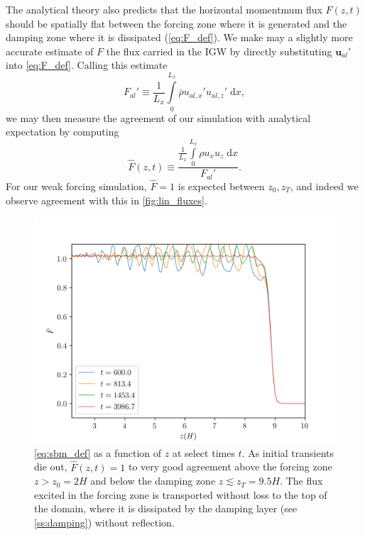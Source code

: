 \documentclass[
        fleqn,
        usenatbib,
    ]{mnras}
\newcommand*{\bm}[1]{\boldsymbol{\mathbf{#1}}}
\begin{document}
The analytical theory also predicts that the horizontal momentmum flux $F(z, t)$
should be spatially flat between the forcing zone where it is generated and the
damping zone where it is dissipated (\autoref{eq:F_def}). We make may a slightly
more accurate estimate of $F$ the flux carried in the IGW by directly
substituting $\bm{u}_{al}'$ into \autoref{eq:F_def}. Calling this estimate
\begin{equation}
    F_{al}' \equiv \frac{1}{L_x}
        \int\limits_{0}^{L_x} \overline{\rho} u_{al,x}'u_{al,z}'\;\mathrm{d}x,
\end{equation}
we may then measure the agreement of our simulation with analytical expectation
by computing
\begin{equation}
    \hat{F}(z, t) \equiv \frac{
        \frac{1}{L_x}\int\limits_0^{L_x}\rho u_xu_z\;\mathrm{d}x}
        {F_{al}'}.\label{eq:sbm_def}
\end{equation}
For our weak forcing simulation, $\hat{F} = 1$ is expected between $z_0, z_T$,
and indeed we observe agreement with this in \autoref{fig:lin_fluxes}.
\begin{figure}
    \centering
    \includegraphics[width=\columnwidth]{plots/lin_fluxes.png}
    \caption{\autoref{eq:sbm_def} as a function of $z$ at select times $t$. As
    initial transients die out, $\hat{F}(z, t) = 1$ to very good agreement above
    the forcing zone $z > z_0 = 2H$ and below the damping zone $z \lesssim z_T =
    9.5H$. The flux excited in the forcing zone is transported without loss to
    the top of the domain, where it is dissipated by the damping layer (see
    \autoref{ss:damping}) without reflection.}\label{fig:lin_fluxes}
\end{figure}
\end{document}

